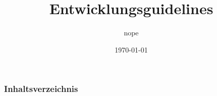 \documentclass[hyperref={pdfpagelabels=false}]{beamer}
\title{Entwicklungsguidelines}
\author{nope}
\date{\today}
\begin{document}
\begin{frame}
\titlepage
\end{frame} 

\begin{frame}
\frametitle{Inhaltsverzeichnis}
\tableofcontents
\end{frame} 




%



\end{document}
